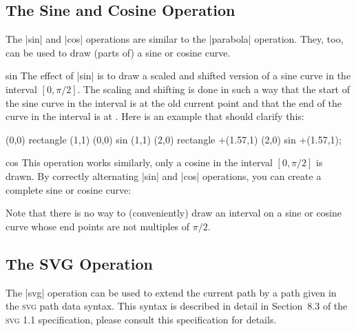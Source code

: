 \subsection{The Sine and Cosine Operation}

The |sin| and |cos| operations are similar to the |parabola| operation. They,
too, can be used to draw (parts of) a sine or cosine curve.

\begin{pathoperation}{sin}{}
    The effect of |sin| is to draw a scaled and shifted version of a sine curve
    in the interval $[0,\pi/2]$. The scaling and shifting is done in such a way
    that the start of the sine curve in the interval is at the old current
    point and that the end of the curve in the interval is at
    . Here is an example that should clarify this:
\begin{codeexample}[]
\tikz \draw (0,0) rectangle (1,1)     (0,0) sin (1,1)
            (2,0) rectangle +(1.57,1) (2,0) sin +(1.57,1);
\end{codeexample}
\end{pathoperation}

\begin{pathoperation}{cos}{}
    This operation works similarly, only a cosine in the interval $[0,\pi/2]$
    is drawn. By correctly alternating |sin| and |cos| operations, you can
    create a complete sine or cosine curve:
\begin{codeexample}[]
\end{codeexample}
\end{pathoperation}

Note that there is no way to (conveniently) draw an interval on a sine or
cosine curve whose end points are not multiples of $\pi/2$.


\subsection{The SVG Operation}

The |svg| operation can be used to extend the current path by a path given in
the \textsc{svg} path data syntax. This syntax is described in detail in
Section~8.3 of the \textsc{svg 1.1} specification, please consult this
specification for details.

